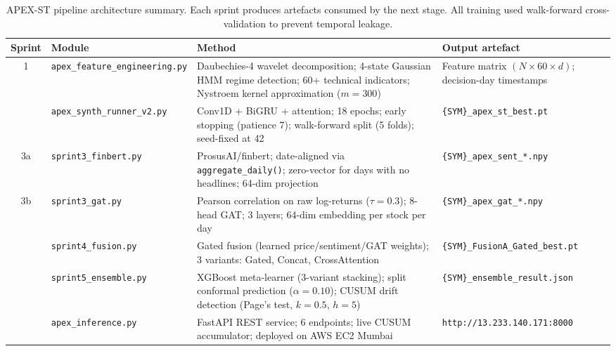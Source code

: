 \begin{table}[htbp]
\centering
\caption{%
  APEX-ST pipeline architecture summary. Each sprint produces artefacts
  consumed by the next stage. All training used walk-forward cross-validation
  to prevent temporal leakage.
}
\label{tab:architecture}
\setlength{\tabcolsep}{5pt}
\begin{tabular}{c l p{4cm} p{3.5cm}}
\toprule
\textbf{Sprint} &
  \textbf{Module} &
  \textbf{Method} &
  \textbf{Output artefact} \\
\midrule
1 &
  \texttt{apex\_feature\_engineering.py} &
  Daubechies-4 wavelet decomposition; 4-state Gaussian HMM regime detection;
  60+ technical indicators; Nystroem kernel approximation ($m=300$) &
  Feature matrix $(N \times 60 \times d)$; decision-day timestamps \\

\addlinespace
2 &
  \texttt{apex\_synth\_runner\_v2.py} &
  Conv1D + BiGRU + attention; 18 epochs; early stopping (patience 7);
  walk-forward split (5 folds); seed-fixed at 42 &
  \texttt{\{SYM\}\_apex\_st\_best.pt} \\

\addlinespace
3a &
  \texttt{sprint3\_finbert.py} &
  ProsusAI/finbert; date-aligned via \texttt{aggregate\_daily()};
  zero-vector for days with no headlines; 64-dim projection &
  \texttt{\{SYM\}\_apex\_sent\_*.npy} \\

\addlinespace
3b &
  \texttt{sprint3\_gat.py} &
  Pearson correlation on raw log-returns ($\tau = 0.3$);
  8-head GAT; 3 layers; 64-dim embedding per stock per day &
  \texttt{\{SYM\}\_apex\_gat\_*.npy} \\

\addlinespace
4 &
  \texttt{sprint4\_fusion.py} &
  Gated fusion (learned price/sentiment/GAT weights);
  3 variants: Gated, Concat, CrossAttention &
  \texttt{\{SYM\}\_FusionA\_Gated\_best.pt} \\

\addlinespace
5 &
  \texttt{sprint5\_ensemble.py} &
  XGBoost meta-learner (3-variant stacking);
  split conformal prediction ($\alpha = 0.10$);
  CUSUM drift detection (Page's test, $k=0.5$, $h=5$) &
  \texttt{\{SYM\}\_ensemble\_result.json} \\

\addlinespace
6 &
  \texttt{apex\_inference.py} &
  FastAPI REST service; 6 endpoints;
  live CUSUM accumulator; deployed on AWS EC2 Mumbai &
  \texttt{http://13.233.140.171:8000} \\

\bottomrule
\end{tabular}
\end{table}


